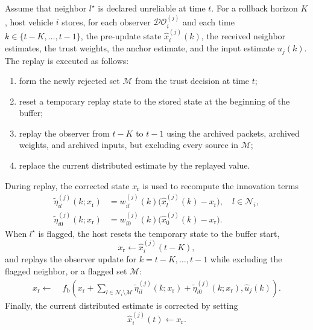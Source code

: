 \documentclass[letterpaper,journal]{IEEEtran}
\def\N{\mathcal{N}} %
\def\DO{\mathcal{DO}} %
\begin{document}
Assume that neighbor $l^{\star}$ is declared unreliable at time $t$. For a rollback horizon $K$, host vehicle $i$ stores, for each observer $\DO_i^{(j)}$ and each time $k\in\{t-K,\ldots,t-1\}$, the pre-update state $\hat{x}_i^{(j)}(k)$, the received neighbor estimates, the trust weights, the anchor estimate, and the input estimate $\hat{u}_j(k)$. The replay is executed as follows:
\begin{enumerate}
    \item form the newly rejected set $\mathcal{M}$ from the trust decision at time $t$;
    \item reset a temporary replay state to the stored state at the beginning of the buffer;
    \item replay the observer from $t-K$ to $t-1$ using the archived packets, archived weights, and archived inputs, but excluding every source in $\mathcal{M}$;
    \item replace the current distributed estimate by the replayed value.
\end{enumerate}
During replay, the corrected state $x_{\mathrm{r}}$ is used to recompute the innovation terms
\begin{align}
\tilde{\eta}_{il}^{(j)}(k;x_{\mathrm{r}})
&= w_{il}^{(j)}(k)
\big(\hat{x}_l^{(j)}(k)-x_{\mathrm{r}}\big),\quad l\in\N_i, \\
\tilde{\eta}_{i0}^{(j)}(k;x_{\mathrm{r}})
&= w_{i0}^{(j)}(k)
\big(\hat{x}_0^{(j)}(k)-x_{\mathrm{r}}\big).
\end{align}
When $l^{\star}$ is flagged, the host resets the temporary state to the buffer start,
\begin{equation}
    x_{\mathrm{r}} \leftarrow \hat{x}_i^{(j)}(t-K),
\end{equation}
and replays the observer update for $k=t-K,\ldots,t-1$ while excluding the flagged neighbor, or a flagged set $\mathcal{M}$:
\begin{equation}
\begin{aligned}
x_{\mathrm{r}} \leftarrow\;&
f_{\text{b}}\!\left(
x_{\mathrm{r}}
+\sum_{l\in\N_i\setminus\mathcal{M}}\tilde{\eta}_{il}^{(j)}(k;x_{\mathrm{r}})
+ \tilde{\eta}_{i0}^{(j)}(k;x_{\mathrm{r}}),
\hat{u}_j(k)\right).
\end{aligned}
\label{eq_rollback_replay}
\end{equation}
Finally, the current distributed estimate is corrected by setting
\begin{equation}
    \hat{x}_i^{(j)}(t)\leftarrow x_{\mathrm{r}}.
\end{equation}
\end{document}
